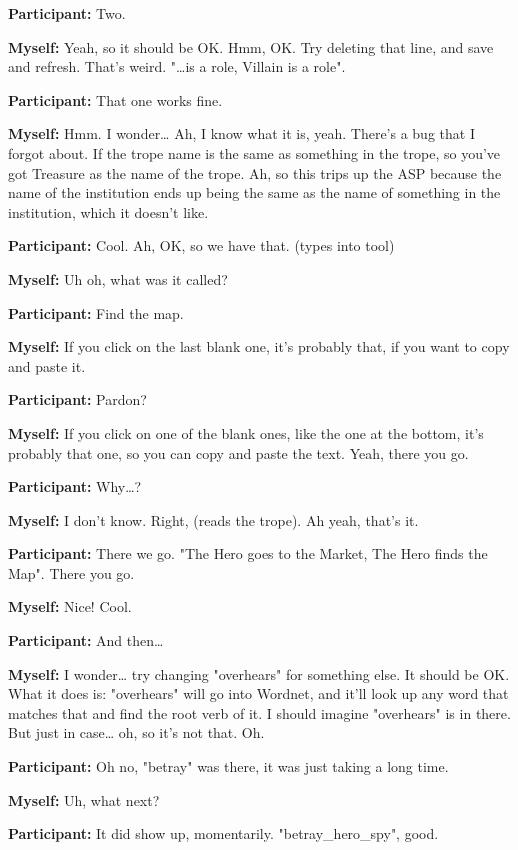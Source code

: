 \documentclass[11pt]{report}
\begin{document}
\begin{linenumbers}
\textbf{Participant:} Two.

\textbf{Myself:} Yeah, so it should be OK. Hmm, OK. Try deleting that line, and save and refresh. That's weird. "\ldots{}is a role, Villain is a role".

\textbf{Participant:} That one works fine.

\textbf{Myself:} Hmm. I wonder\ldots{} Ah, I know what it is, yeah. There's a bug that I forgot about. If the trope name is the same as something in the trope, so you've got Treasure as the name of the trope. Ah, so this trips up the ASP because the name of the institution ends up being the same as the name of something in the institution, which it doesn't like.

\textbf{Participant:} Cool. Ah, OK, so we have that. (types into tool)

\textbf{Myself:} Uh oh, what was it called?

\textbf{Participant:} Find the map.

\textbf{Myself:} If you click on the last blank one, it's probably that, if you want to copy and paste it.

\textbf{Participant:} Pardon?

\textbf{Myself:} If you click on one of the blank ones, like the one at the bottom, it's probably that one, so you can copy and paste the text. Yeah, there you go.

\textbf{Participant:} Why\ldots{}?

\textbf{Myself:} I don't know. Right, (reads the trope). Ah yeah, that's it.

\textbf{Participant:} There we go. "The Hero goes to the Market, The Hero finds the Map". There you go.

\textbf{Myself:} Nice! Cool.

\textbf{Participant:} And then\ldots{}

\textbf{Myself:} I wonder\ldots{} try changing "overhears" for something else. It should be OK. What it does is: "overhears" will go into Wordnet, and it'll look up any word that matches that and find the root verb of it. I should imagine "overhears" is in there. But just in case\ldots{} oh, so it's not that. Oh.

\textbf{Participant:} Oh no, "betray" was there, it was just taking a long time.

\textbf{Myself:} Uh, what next?

\textbf{Participant:} It did show up, momentarily. "betray_hero_spy", good.


\end{linenumbers}
\end{document}
